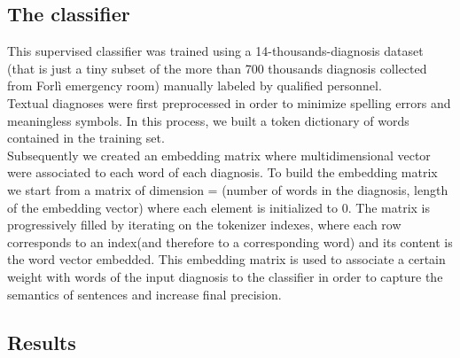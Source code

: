 \subsection{The classifier}
This supervised classifier was trained using a 14-thousands-diagnosis dataset (that is just a tiny subset of the more than 700 thousands diagnosis collected from Forlì emergency room) manually labeled by qualified personnel.\\
Textual diagnoses were first preprocessed in order to minimize spelling errors and meaningless symbols. In this process, we built a token dictionary of words contained in the training set.\\
Subsequently we created an embedding matrix where multidimensional vector were associated to each word of each diagnosis.
To build the embedding matrix we start from a matrix of dimension = (number of words in the diagnosis, length of the embedding vector) where each element is initialized to 0. The matrix is progressively filled by iterating on the tokenizer indexes, where each row corresponds to an index(and therefore to a corresponding word) and its content is the word vector embedded.
This embedding matrix is used to associate a certain weight with words of the input diagnosis to the classifier in order to capture the semantics of sentences and increase final precision.

\subsection{Results}

